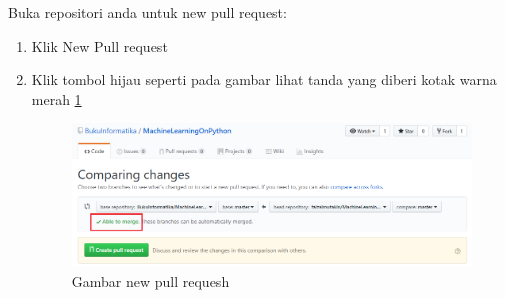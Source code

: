 Buka repositori anda untuk new pull request:
\begin{enumerate}
\item Klik New Pull request
\item Klik tombol hijau seperti pada gambar lihat tanda yang diberi kotak warna merah \ref{labelgambar1} 
		\begin{figure}[htbp]
		\centering
		\includegraphics[width=1\textwidth]{figures/1.PNG}
		\caption{Gambar new pull requesh}
		\label{labelgambar1}
		\end{figure}	 
\end{enumerate}